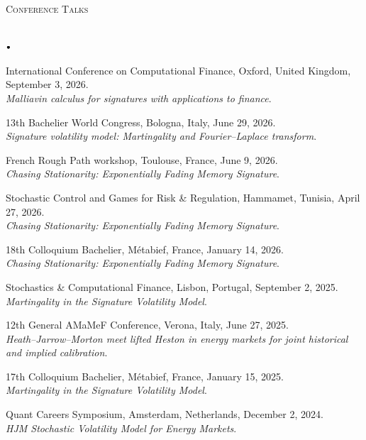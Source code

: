 \documentclass[11pt]{article}
\newcommand{\lineunder}{\vspace*{-8pt} \\ \hspace*{-18pt} \hrulefill \\}
\newcommand{\header}[1]{{\hspace*{-15pt}\vspace*{6pt} \textsc{#1}} \vspace*{-6pt} \lineunder}
\newcommand{\lbt}{\,\begin{picture}(-1,1)(-1,-3)\circle*{3}\end{picture}\ }
\newenvironment{achievements}{
    \begin{list}{$\lbt$}{
        \topsep 0pt
        \itemsep 0pt
        \addtolength{\leftmargin}{-0.1in}
    }
}
{
    \vspace*{4pt}
    \end{list}
}
\begin{document}
\header{Conference Talks}
\vspace{2mm}
\begin{achievements}
\item International Conference on Computational Finance, Oxford, United Kingdom, September 3, 2026. \\ \textit{Malliavin calculus for signatures with applications to finance}.
\item 13th Bachelier World Congress, Bologna, Italy, June 29, 2026. \\ \textit{Signature volatility model: Martingality and Fourier--Laplace transform}.
\item French Rough Path workshop, Toulouse, France, June 9, 2026. \\ \textit{Chasing Stationarity: Exponentially Fading Memory Signature}.
\item Stochastic Control and Games for Risk \& Regulation, Hammamet, Tunisia, April 27, 2026. \\ \textit{Chasing Stationarity: Exponentially Fading Memory Signature}.
\item 18th Colloquium Bachelier, Métabief, France, January 14, 2026. \\ \textit{Chasing Stationarity: Exponentially Fading Memory Signature}.
\item Stochastics \& Computational Finance, Lisbon, Portugal, September 2, 2025. \\ \textit{Martingality in the Signature Volatility Model}.
\item 12th General AMaMeF Conference, Verona, Italy, June 27, 2025. \\ \textit{Heath–Jarrow–Morton meet lifted Heston in energy markets for joint historical and implied calibration}.
\item 17th Colloquium Bachelier, Métabief, France, January 15, 2025. \\ \textit{Martingality in the Signature Volatility Model}.
\item Quant Careers Symposium, Amsterdam, Netherlands, December 2, 2024. \\ \textit{HJM Stochastic Volatility Model for Energy Markets}.
\end{achievements}
\end{document}
